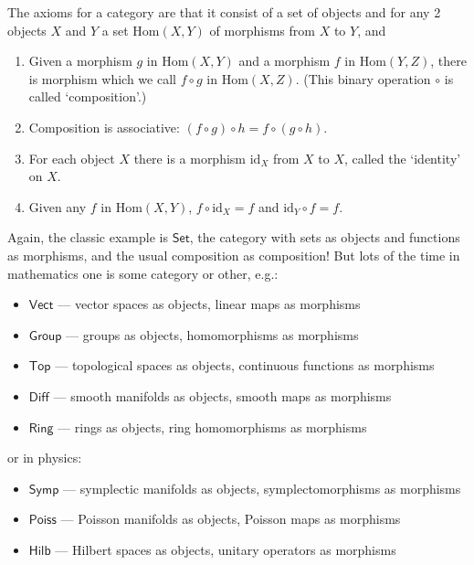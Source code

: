 \documentclass{article}
\def\tightlist{}
\begin{document}
The axioms for a category are that it consist of a set of objects and
for any 2 objects \(X\) and \(Y\) a set \(\mathrm{Hom}(X,Y)\) of
morphisms from \(X\) to \(Y\), and

\begin{enumerate}
\def\labelenumi{\alph{enumi})}
\item
  Given a morphism \(g\) in \(\mathrm{Hom}(X,Y)\) and a morphism \(f\)
  in \(\mathrm{Hom}(Y,Z)\), there is morphism which we call \(f\circ g\)
  in \(\mathrm{Hom}(X,Z)\). (This binary operation \(\circ\) is called
  `composition'.)
\item
  Composition is associative: \((f\circ g)\circ h = f\circ (g\circ h)\).
\item
  For each object \(X\) there is a morphism \(\mathrm{id}_X\) from \(X\)
  to \(X\), called the `identity' on \(X\).
\item
  Given any \(f\) in \(\mathrm{Hom}(X,Y)\),
  \(f \circ \mathrm{id}_X = f\) and \(\mathrm{id}_Y \circ f = f\).
\end{enumerate}

Again, the classic example is \(\mathsf{Set}\), the category with sets
as objects and functions as morphisms, and the usual composition as
composition! But lots of the time in mathematics one is some category or
other, e.g.:

\begin{itemize}
\tightlist
\item
  \(\mathsf{Vect}\) --- vector spaces as objects, linear maps as
  morphisms
\item
  \(\mathsf{Group}\) --- groups as objects, homomorphisms as morphisms
\item
  \(\mathsf{Top}\) --- topological spaces as objects, continuous
  functions as morphisms
\item
  \(\mathsf{Diff}\) --- smooth manifolds as objects, smooth maps as
  morphisms
\item
  \(\mathsf{Ring}\) --- rings as objects, ring homomorphisms as
  morphisms
\end{itemize}

or in physics:

\begin{itemize}
\tightlist
\item
  \(\mathsf{Symp}\) --- symplectic manifolds as objects,
  symplectomorphisms as morphisms
\item
  \(\mathsf{Poiss}\) --- Poisson manifolds as objects, Poisson maps as
  morphisms
\item
  \(\mathsf{Hilb}\) --- Hilbert spaces as objects, unitary operators as
  morphisms
\end{itemize}
\end{document}
